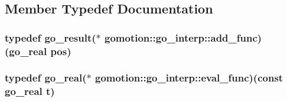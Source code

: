 \subsection{Member Typedef Documentation}
\hypertarget{classgomotion_1_1go__interp_a2e1c3adf730ce4f1e90ea89b33065d1f}{
\subsubsection[{add\-\_\-func}]{\setlength{\rightskip}{0pt plus 5cm}typedef {\bf go\-\_\-result}($\ast$ gomotion\-::go\-\_\-interp\-::add\-\_\-func)({\bf go\-\_\-real} pos)}}\label{classgomotion_1_1go__interp_a2e1c3adf730ce4f1e90ea89b33065d1f}
\hypertarget{classgomotion_1_1go__interp_aace47fd625555ec94aed92da3cc3f9ab}{
\subsubsection[{eval\-\_\-func}]{\setlength{\rightskip}{0pt plus 5cm}typedef {\bf go\-\_\-real}($\ast$ gomotion\-::go\-\_\-interp\-::eval\-\_\-func)(const {\bf go\-\_\-real} t)}}\label{classgomotion_1_1go__interp_aace47fd625555ec94aed92da3cc3f9ab}


